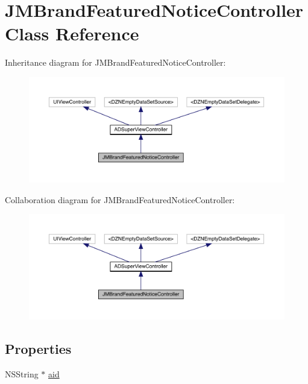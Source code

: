 \hypertarget{interface_j_m_brand_featured_notice_controller}{}\section{J\+M\+Brand\+Featured\+Notice\+Controller Class Reference}
\label{interface_j_m_brand_featured_notice_controller}


Inheritance diagram for J\+M\+Brand\+Featured\+Notice\+Controller\+:\nopagebreak
\begin{figure}[H]
\begin{center}
\leavevmode
\includegraphics[width=350pt]{interface_j_m_brand_featured_notice_controller__inherit__graph}
\end{center}
\end{figure}


Collaboration diagram for J\+M\+Brand\+Featured\+Notice\+Controller\+:\nopagebreak
\begin{figure}[H]
\begin{center}
\leavevmode
\includegraphics[width=350pt]{interface_j_m_brand_featured_notice_controller__coll__graph}
\end{center}
\end{figure}
\subsection*{Properties}
\begin{DoxyCompactItemize}
\item 
N\+S\+String $\ast$ \mbox{\hyperlink{interface_j_m_brand_featured_notice_controller_a6fbd5e9a64d44bbd6c6791e46dfdbbd9}{aid}}
\end{DoxyCompactItemize}
